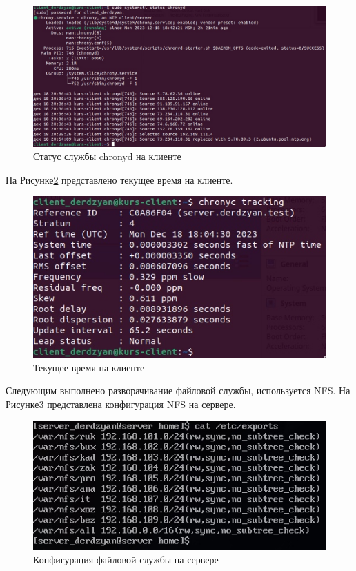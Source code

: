 \begin{figure}[H]
\centering
\includegraphics[scale=0.39]{../misc/chronyd_client.jpg}
\caption{Статус службы chronyd на клиенте\label{fig:NTP_status_client}}
\end{figure}

На Рисунке\;\ref{fig:NTP_now_client} представлено текущее время на клиенте.

\begin{figure}[H]
\centering
\includegraphics[scale=0.6]{../misc/chronyc_now_client.jpg}
\caption{Текущее время на клиенте\label{fig:NTP_now_client}}
\end{figure}

Следующим выполнено разворачивание файловой службы, используется NFS. На Рисунке\;\ref{fig:NFS_config} представлена конфигурация NFS на сервере.

\begin{figure}[H]
\centering
\includegraphics[scale=0.6]{../misc/NFS_config.jpg}
\caption{Конфигурация файловой службы на сервере\label{fig:NFS_config}}
\end{figure}

